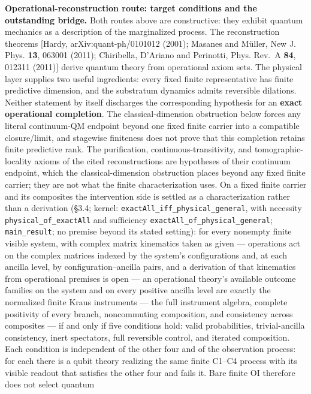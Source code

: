\documentclass[
]{article}
\begin{document}
\textbf{Operational-reconstruction route: target conditions and the
outstanding bridge.} Both routes above are constructive: they exhibit
quantum mechanics as a description of the marginalized process. The
reconstruction theorems {[}Hardy, arXiv:quant-ph/0101012 (2001); Masanes
and Müller, New J. Phys. \textbf{13}, 063001 (2011); Chiribella,
D'Ariano and Perinotti, Phys. Rev.~A \textbf{84}, 012311 (2011){]}
derive quantum theory from operational axiom sets. The physical layer
supplies two useful ingredients: every fixed finite representative has
finite predictive dimension, and the substratum dynamics admits
reversible dilations. Neither statement by itself discharges the
corresponding hypothesis for an \textbf{exact operational completion}.
The classical-dimension obstruction below forces any literal
continuum-QM endpoint beyond one fixed finite carrier into a compatible
closure/limit, and stagewise finiteness does not prove that this
completion retains finite predictive rank. The purification,
continuous-transitivity, and tomographic-locality axioms of the cited
reconstructions are hypotheses of their continuum endpoint, which the
classical-dimension obstruction places beyond any fixed finite carrier;
they are not what the finite characterization uses. On a fixed finite
carrier and its composites the intervention side is settled as a
characterization rather than a derivation (§3.4; kernel:
\texttt{exactAll\_iff\_physical\_general}, with necessity
\texttt{physical\_of\_exactAll} and sufficiency
\texttt{exactAll\_of\_physical\_general}; \texttt{main\_result}; no
premise beyond its stated setting): for every nonempty finite visible
system, with complex matrix kinematics taken as given --- operations act
on the complex matrices indexed by the system's configurations and, at
each ancilla level, by configuration--ancilla pairs, and a derivation of
that kinematics from operational premises is open --- an operational
theory's available outcome families on the system and on every positive
ancilla level are exactly the normalized finite Kraus instruments ---
the full instrument algebra, complete positivity of every branch,
noncommuting composition, and consistency across composites --- if and
only if five conditions hold: valid probabilities, trivial-ancilla
consistency, inert spectators, full reversible control, and iterated
composition. Each condition is independent of the other four and of the
observation process: for each there is a qubit theory realizing the same
finite C1--C4 process with its visible readout that satisfies the other
four and fails it. Bare finite OI therefore does not select quantum
\end{document}
